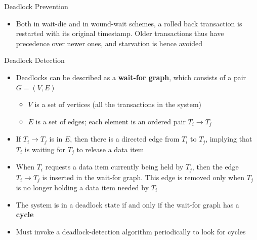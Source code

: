 \documentclass[aspectratio=169, xcolor=dvipsnames]{beamer}
\begin{document}
\begin{frame}{Deadlock Prevention}
    \begin{itemize}[<+->]
        \item Both in wait-die and in wound-wait schemes, a rolled back transaction is restarted with its original timestamp. Older transactions thus have precedence over newer ones, and starvation is hence avoided
    \end{itemize}
\end{frame}

\begin{frame}{Deadlock Detection}
    \begin{itemize}[<+->]
        \item Deadlocks can be described as a \textbf{wait-for graph}, which consists of a pair $G = (V, E)$
        \begin{itemize}
            \item[$\triangleright$] $V$ is a set of vertices (all the transactions in the system)
            \item[$\triangleright$] $E$ is a set of edges; each element is an ordered pair $T_i \rightarrow T_j$
        \end{itemize}
        \item If $T_i \rightarrow T_j$ is in $E$, then there is a directed edge from $T_i$ to $T_j$, implying that $T_i$ is waiting for $T_j$ to release a data item
        \item When $T_i$ requests a data item currently being held by $T_j$, then the edge $T_i \rightarrow T_j$ is inserted in the wait-for graph. This edge is removed only when $T_j$ is no longer holding a data item needed by $T_i$
        \item The system is in a deadlock state if and only if the wait-for graph has a \textbf{cycle}
        \item Must invoke a deadlock-detection algorithm periodically to look for cycles
    \end{itemize}
\end{frame}
\end{document}
